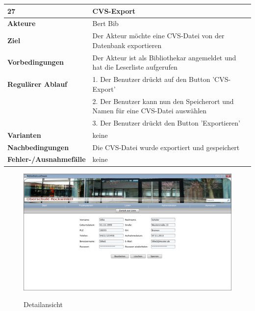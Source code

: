 \documentclass[fontsize=12pt,paper=a4,twoside]{scrartcl}
\begin{document}
\newpage
\begin{table}[htbp]
\label{27}
\begin{tabular}{|l|p{10cm}|}
\hline 
\textbf{27} & \textbf{CVS-Export} \\ \hline
\textbf{Akteure} & Bert Bib\\ \hline
\textbf{Ziel} & Der Akteur möchte eine CVS-Datei von der Datenbank exportieren \\ \hline
\textbf{Vorbedingungen} & Der Akteur ist als Bibliothekar angemeldet und hat die Leserliste 
aufgerufen \\ \hline
\textbf{Regulärer Ablauf} & 
1. Der Benutzer drückt auf den Button 'CVS-Export' \\
&2. Der Benutzer kann nun den Speicherort und Namen für eine CVS-Datei auswählen\\
&3. Der Benutzer drückt den Button 'Exportieren'\\
\hline
\textbf{Varianten} & 
keine \\ \hline
\textbf{Nachbedingungen} & Die CVS-Datei wurde exportiert und gespeichert\\ \hline
\textbf{Fehler-/Ausnahmefälle} & keine\\
\hline
\end{tabular}
\end{table}

\begin{figure}[htbp]
\caption{Detailansicht}
\includegraphics[width=1\textwidth]{ScreensWebsite/DetailansichtLeser.png}
  \label{Detailansicht}
\end{figure}
\end{document}
